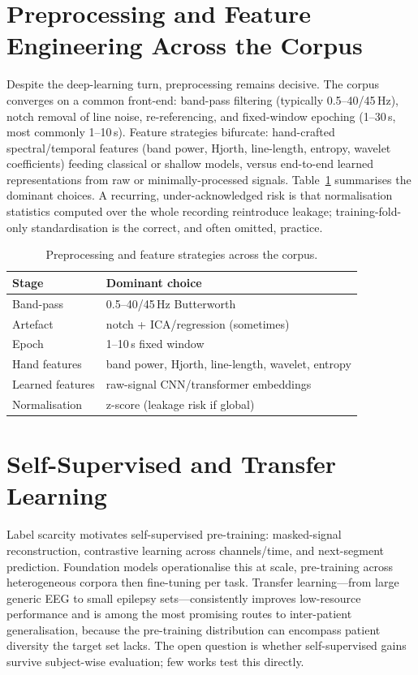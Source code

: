 \section{Preprocessing and Feature Engineering Across the Corpus}
Despite the deep-learning turn, preprocessing remains decisive. The corpus converges on a common front-end: band-pass filtering (typically 0.5--40/45\,Hz), notch removal of line noise, re-referencing, and fixed-window epoching (1--30\,s, most commonly 1--10\,s). Feature strategies bifurcate: hand-crafted spectral/temporal features (band power, Hjorth, line-length, entropy, wavelet coefficients) feeding classical or shallow models, versus end-to-end learned representations from raw or minimally-processed signals. Table~\ref{tab:prep} summarises the dominant choices. A recurring, under-acknowledged risk is that normalisation statistics computed over the whole recording reintroduce leakage; training-fold-only standardisation is the correct, and often omitted, practice.
\begin{table}[h]\centering\caption{Preprocessing and feature strategies across the corpus.}\label{tab:prep}
\footnotesize\begin{tabular}{ll}\toprule
Stage & Dominant choice\\\midrule
Band-pass & 0.5--40/45\,Hz Butterworth\\
Artefact & notch + ICA/regression (sometimes)\\
Epoch & 1--10\,s fixed window\\
Hand features & band power, Hjorth, line-length, wavelet, entropy\\
Learned features & raw-signal CNN/transformer embeddings\\
Normalisation & z-score (leakage risk if global)\\\bottomrule
\end{tabular}\end{table}

\section{Self-Supervised and Transfer Learning}
Label scarcity motivates self-supervised pre-training: masked-signal reconstruction, contrastive learning across channels/time, and next-segment prediction. Foundation models \citep{ep251108861} operationalise this at scale, pre-training across heterogeneous corpora then fine-tuning per task. Transfer learning---from large generic EEG to small epilepsy sets---consistently improves low-resource performance \citep{ep250715118} and is among the most promising routes to inter-patient generalisation, because the pre-training distribution can encompass patient diversity the target set lacks. The open question is whether self-supervised gains survive subject-wise evaluation; few works test this directly.

